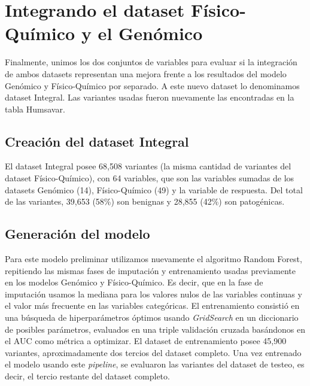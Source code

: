 \newpage


\section{Integrando el dataset Físico-Químico y el Genómico}

Finalmente, unimos los dos conjuntos de variables para evaluar si la integración de ambos datasets representan una mejora frente a los resultados del modelo Genómico y Físico-Químico por separado. A este nuevo dataset lo denominamos dataset Integral. Las variantes usadas fueron nuevamente las encontradas en la tabla Humsavar. 

\subsection{Creación del dataset Integral}

El dataset Integral posee 68,508 variantes (la misma cantidad de variantes del dataset Físico-Químico), con 64 variables, que son las variables sumadas de los datasets Genómico (14), Físico-Químico (49) y la variable de respuesta. Del total de las variantes, 39,653 (58\%) son benignas y 28,855 (42\%) son patogénicas. 

\subsection{Generación del modelo}

Para este modelo preliminar utilizamos nuevamente el algoritmo Random Forest, repitiendo las mismas fases de imputación y entrenamiento usadas previamente en los modelos Genómico y Físico-Químico. Es decir, que en la fase de imputación usamos la mediana para los valores nulos de las variables continuas y el valor más frecuente en las variables categóricas. El entrenamiento consistió en una búsqueda de hiperparámetros óptimos usando \textit{GridSearch} en un diccionario de posibles parámetros, evaluados en una triple validación cruzada basándonos en el AUC como métrica a optimizar. El dataset de entrenamiento posee 45,900 variantes, aproximadamente dos tercios del dataset completo. Una vez entrenado el modelo usando este \textit{pipeline}, se evaluaron las variantes del dataset de testeo, es decir, el tercio restante del dataset completo.

